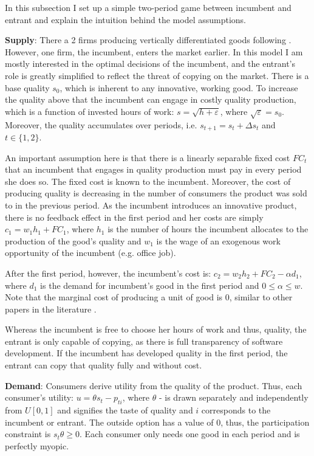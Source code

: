\documentclass[13pt]{article}
\numberwithin{figure}{section}
\numberwithin{table}{section}
\theoremstyle{indented}
\numberwithin{equation}{section} %
\begin{document}
In this subsection I set up a simple two-period game between incumbent and entrant and explain the intuition behind the model assumptions.

\textbf{Supply}:
There a 2 firms producing vertically differentiated goods following  \citet{Tirole}. However, one firm, the incumbent, enters the market earlier. In this model I am mostly interested in the optimal decisions of the incumbent, and the entrant's role is greatly simplified to reflect the threat of copying on the market. There is a base quality $s_0$, which is inherent to any innovative, working good. To increase the quality above that the incumbent can engage in costly quality production, which is a function of invested hours of work: $s=\sqrt{h +\varepsilon}$, where $\sqrt{\varepsilon} = s_0$. Moreover, the quality accumulates over periods, i.e. $s_{t+1}=s_{t}+\Delta s_t$ and $t \in \{1,2\}$. 

An important assumption here is that there is a linearly separable fixed cost $FC_t$ that an incumbent that engages in quality production must pay in every period she does so. The fixed cost is known to the incumbent. Moreover, the cost of producing quality is decreasing in the number of consumers the product was sold to in the previous period. As the incumbent introduces an innovative product, there is no feedback effect in the first period and her costs are simply $c_1= w_1h_1 + FC_1$, where $h_1$ is the number of hours the incumbent allocates to the production of the good's quality and $w_1$ is the wage of an exogenous work opportunity of the incumbent (e.g. office job). 

After the first period, however, the incumbent's cost is: $c_2= w_2h_2 + FC_2 - \alpha d_1$, where $d_1$ is the demand for incumbent's good in the first period and $0\leq \alpha \leq w$. Note that the marginal cost of producing a unit of good is 0, similar to other papers in the literature \citep{Ajorlou2018}. 

Whereas the incumbent is free to choose her hours of work and thus, quality, the entrant is only capable of copying, as there is full transparency of software development. If the incumbent has developed quality in the first period, the entrant can copy that quality fully and without cost.

\textbf{Demand}: 
Consumers derive utility from the quality of the product. Thus, each consumer's utility: $u = \theta s_t - p_{ti}$, where $\theta$ - is drawn separately and independently from $U[0,1]$ and signifies the taste of quality and $i$ corresponds to the incumbent or entrant. The outside option has a value of 0, thus, the participation constraint is $s_t \theta \geq 0$.  Each consumer only needs one good in each period and is perfectly myopic.
\end{document}
